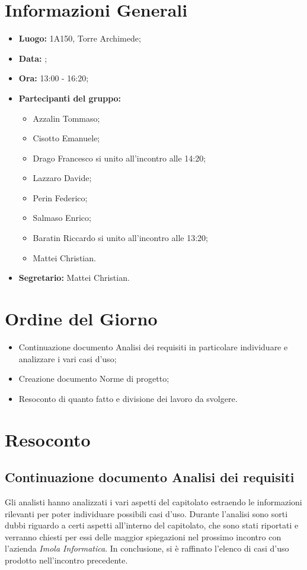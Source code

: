 \section{Informazioni Generali}
\begin{itemize}
\item \textbf{Luogo:} 1A150, Torre Archimede;
\item \textbf{Data:} \Data;
\item \textbf{Ora:} 13:00 - 16:20;
\item \textbf{Partecipanti del gruppo:}
	\begin{itemize}
	\item Azzalin Tommaso; 
	\item Cisotto Emanuele; 
	\item Drago Francesco si unito all'incontro alle 14:20;
	\item Lazzaro Davide;
	\item Perin Federico;
	\item Salmaso Enrico;
	\item Baratin Riccardo si unito all'incontro alle 13:20;
	\item Mattei Christian.
	\end{itemize} 
\item \textbf{Segretario:} Mattei Christian.
\end{itemize}


\section{Ordine del Giorno}
\begin{itemize}
	\item Continuazione documento Analisi dei requisiti in particolare individuare e analizzare i vari casi d'uso;
	\item Creazione documento Norme di progetto;
	\item Resoconto di quanto fatto e divisione dei lavoro da svolgere.
\end{itemize}


\section{Resoconto}
\subsection{Continuazione documento Analisi dei requisiti}
Gli analisti hanno analizzati i vari aspetti del capitolato estraendo le informazioni rilevanti per poter individuare possibili casi d’uso. Durante l’analisi sono sorti dubbi riguardo a certi aspetti all’interno del capitolato, che sono stati riportati e verranno chiesti per essi delle maggior spiegazioni nel prossimo incontro con l’azienda \textit{Imola Informatica}. In conclusione, si è raffinato l’elenco di casi d’uso prodotto nell’incontro precedente.

